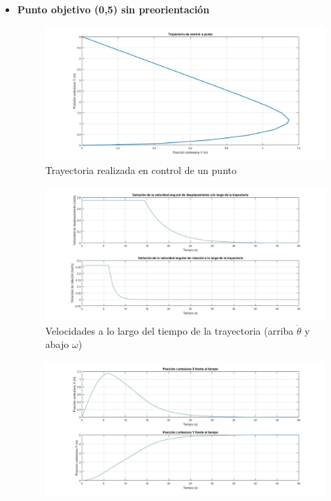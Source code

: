 \documentclass[a4paper,twoside]{article}
\begin{document}
	\begin{itemize}
		\item \textbf{Punto objetivo (0,5) sin preorientación}
		\begin{figure}[h!]
		\centering
		\includegraphics[width=1\textwidth]{control_punto_1}
		\caption{Trayectoria realizada en control de un punto}
		\end{figure}
		\begin{figure}[h!]
			\centering
			\includegraphics[width=1\textwidth]{control_punto_1_2}
			\caption{Velocidades a lo largo del tiempo de la trayectoria (arriba $\dot{\theta}$ y abajo $\omega$)}
		\end{figure}
		\begin{figure}[h!]
		\centering
		\includegraphics[width=1\textwidth]{control_punto_1_3}

\end{figure}
\end{itemize}
\end{document}
